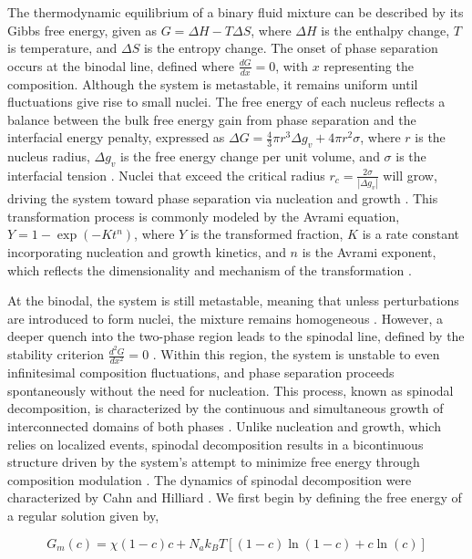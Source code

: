 The thermodynamic equilibrium of a binary fluid mixture can be described by its Gibbs free energy, given as $G = \Delta H - T \Delta S$, where \(\Delta H\) is the enthalpy change, 
\(T\) is temperature, and \(\Delta S\) is the entropy change. The onset of phase separation occurs at the binodal line, defined where \(\frac{dG}{dx} = 0\), with \(x\) representing the composition. 
Although the system is metastable, it remains uniform until fluctuations give rise to small nuclei. The free energy of each nucleus reflects a 
balance between the bulk free energy gain from phase separation and the interfacial energy penalty, expressed as \(\Delta G = \frac{4}{3}\pi r^3 \Delta g_v + 4 \pi r^2 \sigma\), where \(r\) is 
the nucleus radius, \(\Delta g_v\) is the free energy change per unit volume, and \(\sigma\) is the interfacial tension \cite{thanh_mechanisms_2014}. 
Nuclei that exceed the critical radius \(r_c = \frac{2\sigma}{|\Delta g_v|}\) will grow, driving the system toward phase separation via nucleation and growth \cite{thanh_mechanisms_2014}. 
This transformation process is commonly modeled by the Avrami equation, \(Y = 1 - \exp(-K t^n)\), where \(Y\) is the 
transformed fraction, \(K\) is a rate constant incorporating nucleation and growth kinetics, and \(n\) is the Avrami exponent, which reflects the dimensionality and mechanism of the transformation
\cite{avrami_kinetics_1939}.

At the binodal, the system is still metastable, meaning that unless perturbations are introduced to form nuclei, the mixture remains homogeneous \cite{thanh_mechanisms_2014}.
However, a deeper quench into the two-phase region leads to the spinodal line, defined by the stability criterion \(\frac{d^2G}{dx^2} = 0\) \cite{cahn_free_1958}. 
Within this region, the system is unstable to even infinitesimal composition fluctuations, and phase 
separation proceeds spontaneously without the need for nucleation. This process, known as spinodal decomposition, is characterized by the continuous and simultaneous growth of interconnected 
domains of both phases \cite{cahn_free_1958}. Unlike nucleation and growth, which relies on localized events, spinodal decomposition 
results in a bicontinuous structure driven by the system's attempt to minimize 
free energy through composition modulation \cite{cahn_free_1958}. The dynamics of spinodal decomposition were characterized by Cahn and Hilliard \cite{cahn_spinodal_1961}. 
We first begin by defining the free energy of a regular solution given by,

\begin{equation}
    G_m (c) = \chi (1 - c)c + N_a k_B T \left[(1 - c)\ln(1 - c) + c \ln(c)\right]
\end{equation}

